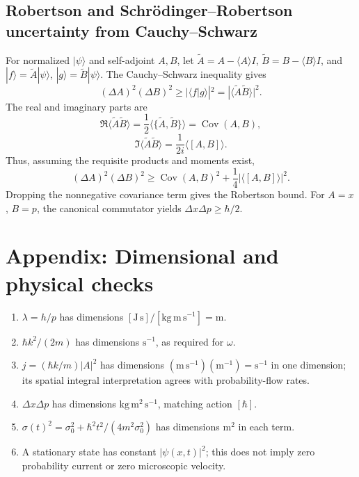 \documentclass[11pt,a4paper]{article}
\newcommand{\Cov}{\operatorname{Cov}}
\begin{document}
\subsection{Robertson and Schr\"odinger--Robertson uncertainty from Cauchy--Schwarz}
For normalized $|\psi\rangle$ and self-adjoint $A,B$, let $\tilde A=A-\langle A\rangle I$, $\tilde B=B-\langle B\rangle I$, and $|f\rangle=\tilde A|\psi\rangle$, $|g\rangle=\tilde B|\psi\rangle$. The Cauchy--Schwarz inequality gives
\begin{equation}
(\Delta A)^2(\Delta B)^2\ge|\langle f|g\rangle|^2
=|\langle\tilde A\tilde B\rangle|^2.
\end{equation}
The real and imaginary parts are
\begin{equation}
\Re\langle\tilde A\tilde B\rangle=\frac12\langle\{\tilde A,\tilde B\}\rangle=\Cov(A,B),
\end{equation}
\begin{equation}
\Im\langle\tilde A\tilde B\rangle=\frac1{2i}\langle[A,B]\rangle.
\end{equation}
Thus, assuming the requisite products and moments exist,
\begin{equation}
\boxed{(\Delta A)^2(\Delta B)^2\ge\Cov(A,B)^2+\frac14|\langle[A,B]\rangle|^2}.
\end{equation}
Dropping the nonnegative covariance term gives the Robertson bound. For $A=x$, $B=p$, the canonical commutator yields $\Delta x\Delta p\ge\hbar/2$.

\section{Appendix: Dimensional and physical checks}
\begin{enumerate}[leftmargin=*]
\item $\lambda=h/p$ has dimensions $[\mathrm{J\,s}]/[\mathrm{kg\,m\,s^{-1}}]=\mathrm m$.
\item $\hbar k^2/(2m)$ has dimensions $\mathrm{s^{-1}}$, as required for $\omega$.
\item $j=(\hbar k/m)|A|^2$ has dimensions $(\mathrm{m\,s^{-1}})(\mathrm{m^{-1}})=\mathrm{s^{-1}}$ in one dimension; its spatial integral interpretation agrees with probability-flow rates.
\item $\Delta x\Delta p$ has dimensions $\mathrm{kg\,m^2\,s^{-1}}$, matching action $[\hbar]$.
\item $\sigma(t)^2=\sigma_0^2+\hbar^2t^2/(4m^2\sigma_0^2)$ has dimensions $\mathrm m^2$ in each term.
\item A stationary state has constant $|\psi(x,t)|^2$; this does not imply zero probability current or zero microscopic velocity.
\end{enumerate}
\end{document}
